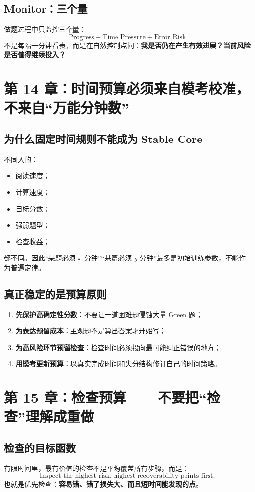 \documentclass[11pt,a4paper]{ctexart}
\newcommand{\kw}[1]{\textbf{#1}}
\begin{document}
\subsection{Monitor：三个量}
做题过程中只监控三个量：
\[
\boxed{
\text{Progress}
+\text{Time Pressure}
+\text{Error Risk}
}
\]
不是每隔一分钟看表，而是在自然控制点问：\kw{我是否仍在产生有效进展？当前风险是否值得继续投入？}

\section{第 14 章：时间预算必须来自模考校准，不来自“万能分钟数”}

\subsection{为什么固定时间规则不能成为 Stable Core}
不同人的：
\begin{itemize}
  \item 阅读速度；
  \item 计算速度；
  \item 目标分数；
  \item 强弱题型；
  \item 检查收益；
\end{itemize}
都不同。因此“某题必须 $x$ 分钟”“某篇必须 $y$ 分钟”最多是初始训练参数，不能作为普遍定律。

\subsection{真正稳定的是预算原则}
\begin{enumerate}
  \item \kw{先保护高确定性分数}：不要让一道困难题侵蚀大量 Green 题；
  \item \kw{为表达预留成本}：主观题不是算出答案才开始写；
  \item \kw{为高风险环节预留检查}：检查时间必须投向最可能纠正错误的地方；
  \item \kw{用模考更新预算}：以真实完成时间和失分结构修订自己的时间策略。
\end{enumerate}

\section{第 15 章：检查预算——不要把“检查”理解成重做}

\subsection{检查的目标函数}
有限时间里，最有价值的检查不是平均覆盖所有步骤，而是：
\[
\boxed{
\text{Inspect the highest-risk, highest-recoverability points first.}
}
\]
也就是优先检查：\kw{容易错、错了损失大、而且短时间能发现的点}。
\end{document}

